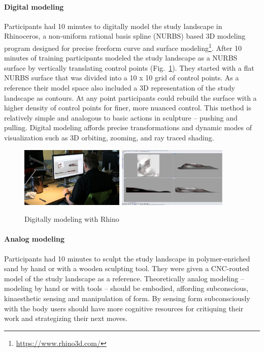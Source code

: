 \documentclass[prodmode,acmtochi]{acmsmall} %
\begin{document}
\paragraph{Digital modeling}
Participants had 10 minutes to digitally model the study landscape in Rhinoceros, 
a non-uniform rational basis spline (NURBS) based 3D modeling program
designed for precise freeform curve and surface modeling\footnote{\url{https://www.rhino3d.com/}}. 
After 10 minutes of training
participants modeled the study landscape as a NURBS surface 
by vertically translating control points (Fig.~\ref{fig:rhino}). 
They started with a flat NURBS surface that was divided into a 10 x 10 grid of control points.
As a reference their model space also included a 3D representation of the study landscape as contours. 
At any point participants could rebuild the surface with a higher density of control points for finer, more nuanced control. 
This method is relatively simple and 
analogous to basic actions in sculpture -- pushing and pulling. 
Digital modeling affords precise transformations and
dynamic modes of visualization such as 
3D orbiting, zooming, and ray traced shading. 

\begin{figure}[H]
\begin{center}
		\includegraphics[height=108px]{images/experiments/art_rhino.jpg}
		\includegraphics[height=108px]{images/experiments/rhino.png}
	\caption{Digitally modeling with Rhino}
	\label{fig:rhino}
\end{center}
\end{figure}

\paragraph{Analog modeling}
Participants had 10 minutes to sculpt the study landscape in polymer-enriched sand 
by hand or with a wooden sculpting tool. 
They were given a CNC-routed model of the study landscape as a reference. 
Theoretically analog modeling -- modeling by hand or with tools -- should be embodied, 
affording subconscious, kinaesthetic sensing and manipulation of form. 
By sensing form subconsciously with the body
users should have more cognitive resources for critiquing their work 
and strategizing their next moves. 
\end{document}
